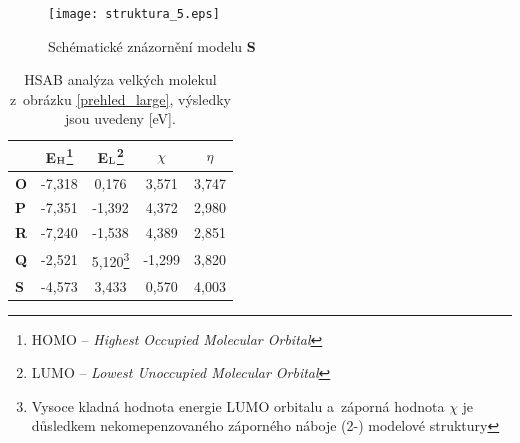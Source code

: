 \documentclass[
digital, %
table,   %
nolof,     %
nolot,     %
oneside,
]{fithesis3}
\begin{document}
\begin{figure}\begin{center}\texttt{[image: struktura\_5.eps]}
\caption{Schématické znázornění modelu \textbf{S}}\label{schema_5}
\end{center}\end{figure}

\begin{table}[H]
\begin{minipage}{\textwidth}
\caption{HSAB analýza velkých molekul z~obrázku \ref{prehled_large}, výsledky jsou uvedeny [eV].}
\begin{center}
\begin{tabular}{|l|c|c|c|c|}
\hline
\label{hsab_large} & E$_{\ce{H}}$\footnote{HOMO -- \textit{Highest Occupied Molecular Orbital}}  & E$_{\ce{L}}$\footnote{LUMO -- \textit{Lowest Unoccupied Molecular Orbital}} & $\chi$  & $\eta$  \\ \hline
\textbf{O} & -7,318 & 0,176 & 3,571 & 3,747 \\ \hline
\textbf{P} & -7,351 & -1,392 & 4,372 & 2,980 \\ \hline
\textbf{R} & -7,240 & -1,538 & 4,389 & 2,851 \\ \hline
\textbf{Q} & -2,521 & 5,120\footnote{Vysoce kladná hodnota energie LUMO orbitalu a~záporná hodnota $\chi$ je důsledkem nekomepenzovaného záporného náboje (2-) modelové struktury} & -1,299 & 3,820 \\ \hline
\textbf{S} & -4,573 & 3,433 & 0,570 & 4,003 \\ \hline
\end{tabular}
\end{center}
\end{minipage}
\end{table}
\end{document}
